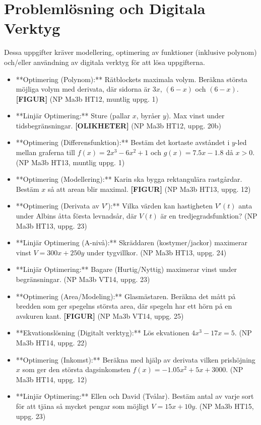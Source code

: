 \documentclass{article}
\begin{document}
\section{Problemlösning och Digitala Verktyg}

Dessa uppgifter kräver modellering, optimering av funktioner (inklusive polynom) och/eller användning av digitala verktyg för att lösa uppgifterna.

\begin{itemize}
    \item **Optimering (Polynom):** Rätblockets maximala volym. Beräkna största möjliga volym med derivata, där sidorna är $3x$, $(6-x)$ och $(6-x)$. \textbf{[FIGUR]} (NP Ma3b HT12, muntlig uppg. 1)
    \item **Linjär Optimering:** Sture (pallar $x$, byråer $y$). Max vinst under tidsbegränsningar. \textbf{[OLIKHETER]} (NP Ma3b HT12, uppg. 20b)
    \item **Optimering (Differensfunktion):** Bestäm det kortaste avståndet i $y$-led mellan graferna till $f(x) = 2x^3 - 6x^2 + 1$ och $g(x) = 7.5x - 1.8$ då $x>0$. (NP Ma3b HT13, muntlig uppg. 1)
    \item **Optimering (Modellering):** Karin ska bygga rektangulära rastgårdar. Bestäm $x$ så att arean blir maximal. \textbf{[FIGUR]} (NP Ma3b HT13, uppg. 12)
    \item **Optimering (Derivata av $V'$):** Vilka värden kan hastigheten $V'(t)$ anta under Albins åtta första levnadsår, där $V(t)$ är en tredjegradsfunktion? (NP Ma3b HT13, uppg. 23)
    \item **Linjär Optimering (A-nivå):** Skräddaren (kostymer/jackor) maximerar vinst $V=300x+250y$ under tygvillkor. (NP Ma3b HT13, uppg. 24)
    \item **Linjär Optimering:** Bagare (Hurtig/Nyttig) maximerar vinst under begränsningar. (NP Ma3b VT14, uppg. 23)
    \item **Optimering (Area/Modeling):** Glasmästaren. Beräkna det mått på bredden som ger spegelns största area, där spegeln har ett hörn på en avskuren kant. \textbf{[FIGUR]} (NP Ma3b VT14, uppg. 25)
    \item **Ekvationslösning (Digitalt verktyg):** Lös ekvationen $4x^3 - 17x = 5$. (NP Ma3b HT14, uppg. 22)
    \item **Optimering (Inkomst):** Beräkna med hjälp av derivata vilken prishöjning $x$ som ger den största dagsinkomsten $f(x) = -1.05x^2 + 5x + 3000$. (NP Ma3b HT14, uppg. 12)
    \item **Linjär Optimering:** Ellen och David (Tvålar). Bestäm antal av varje sort för att tjäna så mycket pengar som möjligt $V=15x+10y$. (NP Ma3b HT15, uppg. 23)

\end{itemize}
\end{document}
